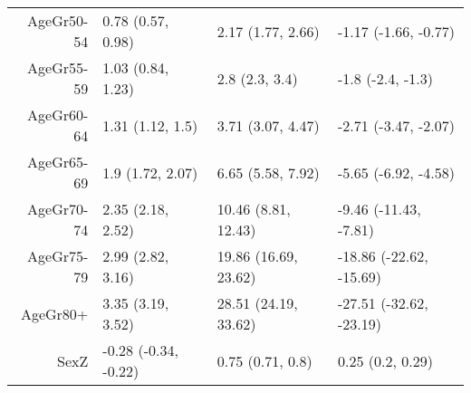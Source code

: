 \begin{table}[ht]
\begin{tabular}{rlll}
  AgeGr50-54 & 0.78 (0.57, 0.98) & 2.17 (1.77, 2.66) & -1.17 (-1.66, -0.77) \\ 
  AgeGr55-59 & 1.03 (0.84, 1.23) & 2.8 (2.3, 3.4) & -1.8 (-2.4, -1.3) \\ 
  AgeGr60-64 & 1.31 (1.12, 1.5) & 3.71 (3.07, 4.47) & -2.71 (-3.47, -2.07) \\ 
  AgeGr65-69 & 1.9 (1.72, 2.07) & 6.65 (5.58, 7.92) & -5.65 (-6.92, -4.58) \\ 
  AgeGr70-74 & 2.35 (2.18, 2.52) & 10.46 (8.81, 12.43) & -9.46 (-11.43, -7.81) \\ 
  AgeGr75-79 & 2.99 (2.82, 3.16) & 19.86 (16.69, 23.62) & -18.86 (-22.62, -15.69) \\ 
  AgeGr80+ & 3.35 (3.19, 3.52) & 28.51 (24.19, 33.62) & -27.51 (-32.62, -23.19) \\ 
  SexZ & -0.28 (-0.34, -0.22) & 0.75 (0.71, 0.8) & 0.25 (0.2, 0.29) \\ 
   \hline
\end{tabular}
\end{table}

